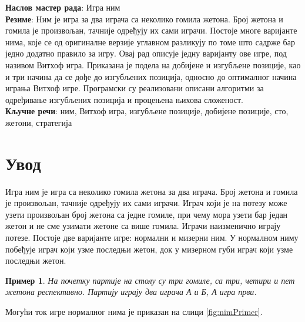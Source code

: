 \documentclass[a4paper]{article}
\newtheorem{example}{Пример}
\begin{document}

\newpage

\textbf{Наслов мастер рада}: Игра ним\\

\textbf{Резиме}: Ним је игра за два играча са неколико гомила жетона. Број жетона и гомила је произвољан, тачније одређују их сами играчи. Постоје многе варијанте нима, које се од оригиналне верзије углавном разликују по томе што садрже бар једно додатно правило за игру. Овај рад описује једну варијанту ове игре, под називом Витхоф игра. Приказана је подела на добијене и изгубљене позиције, као и три начина да се дође до изгубљених позиција, односно до оптималног начина играња Витхоф игре. Програмски су реализовани описани алгоритми за одређивање изгубљених позиција и процењена њихова сложеност.\\

\textbf{Кључне речи}: ним, Витхоф игра, изгубљене позиције, добијене позиције, сто, жетони, стратегија

\newpage

\tableofcontents

\newpage
{}

\section{Увод}
\label{sec:uvod}

Игра ним \cite{carls_buton} је игра са неколико гомила жетона за два играча. Број жетона и гомила је произвољан, тачније одређују их сами играчи. Играч који је на потезу може узети произвољан број жетона са једне гомиле, при чему мора узети бар један жетон и не сме узимати жетоне са више гомила. Играчи наизменично играју потезе. Постоје две варијанте игре: нормални и мизерни ним. У нормалном ниму побеђује играч који узме последњи жетон, док у мизерном губи играч који узме последњи жетон.

\begin{example}
На почетку партије на столу су три гомиле, са три, четири и пет жетона респективно. Партију играју два играча \textit{А} и \textit{Б}, \textit{А} игра први. 
\end{example}

Могући ток игре нормалног нима је приказан на слици \ref{fig:nimPrimer}.
\end{document}
